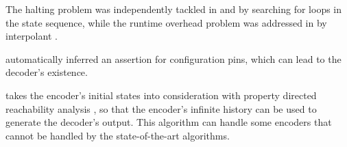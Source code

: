 \documentclass[twocolumn]{article}
\makeatletter
\def\subsection{\@startsection {subsection}{2}{\z@}{16pt plus 2pt minus 2pt}
{6pt plus 2pt minus 2pt}{\normalsize\sl
\edef\@svsec{\thesubsection.\ }}}
\def\thesubsection{\Alph{subsection}}
\makeatother
\begin{document}
The halting problem was independently tackled in \cite{ShenTCAD11} and \cite{LiuICCAD11} by searching for loops in the state sequence,
while the runtime overhead problem was addressed in \cite{ShenTCAD12,LiuICCAD11} by interpolant \cite{interp_McMillan}.

\cite{ShenTCAD12} automatically inferred an assertion for configuration pins, 
which can lead to the decoder's existence.

\cite{TuDAC13} takes the encoder's initial states into consideration
with property directed reachability analysis \cite{EenFMCAD11},
so that the encoder's infinite history can be used to generate the decoder's output.
This algorithm can handle some encoders that cannot be handled by the state-of-the-art algorithms.

% 
% 
% 
\end{document}
